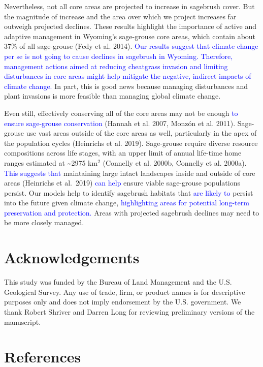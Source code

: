 \documentclass[
  12pt,
]{article}
\begin{document}
Nevertheless, not all core areas are projected to increase in sagebrush cover.
But the magnitude of increase and the area over which we project increases far outweigh projected declines.
These results highlight the importance of active and adaptive management in Wyoming's sage-grouse core areas, which contain about 37\% of all sage-grouse (Fedy et al. 2014).
\textcolor{blue}{Our results suggest that climate change per se is not going to cause declines in sagebrush in Wyoming.}
\textcolor{blue}{Therefore, management actions aimed at reducing cheatgrass invasion and limiting disturbances in core areas might help mitigate the negative, indirect impacts of climate change.}
In part, this is good news because managing disturbances and plant invasions is more feasible than managing global climate change.

Even still, effectively conserving all of the core areas may not be enough \textcolor{blue}{to ensure sage-grouse conservation} (Hannah et al. 2007, Monzón et al. 2011).
Sage-grouse use vast areas outside of the core areas as well, particularly in the apex of the population cycles (Heinrichs et al. 2019).
Sage-grouse require diverse resource compositions across life stages, with an upper limit of annual life-time home ranges estimated at \textasciitilde2975 km\(^2\) (Connelly et al. 2000b, Connelly et al. 2000a).
\textcolor{blue}{This suggests that} maintaining large intact landscapes inside and outside of core areas (Heinrichs et al.~2019) \textcolor{blue}{can help} ensure viable sage-grouse populations persist.
Our models help to identify sagebrush habitats that \textcolor{blue}{are likely to} persist into the future given climate change, \textcolor{blue}{highlighting areas for potential long-term preservation and protection.}
Areas with projected sagebrush declines may need to be more closely managed.

\hypertarget{acknowledgements}{%
\section{Acknowledgements}\label{acknowledgements}}

This study was funded by the Bureau of Land Management and the U.S. Geological Survey.
Any use of trade, firm, or product names is for descriptive purposes only and does not imply endorsement by the U.S. government.
We thank Robert Shriver and Darren Long for reviewing preliminary versions of the manuscript.

\hypertarget{references}{%
\section{References}\label{references}}
\end{document}
